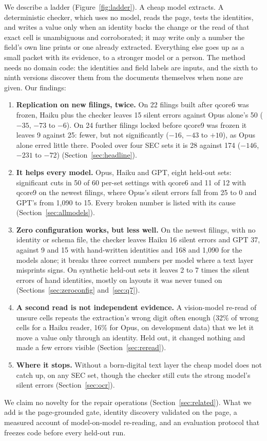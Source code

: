 \documentclass[10pt,twocolumn]{article}
\newcommand{\vq}[1]{\textsf{qcore#1}}
\begin{document}
We describe a ladder (Figure~\ref{fig:ladder}). A cheap model extracts. A deterministic checker, which uses no model, reads the page, tests the identities, and writes a value only when an identity backs the change or the read of that exact cell is unambiguous and corroborated; it may write only a number the field's own line prints or one already extracted. Everything else goes up as a small packet with its evidence, to a stronger model or a person. The method needs no domain code: the identities and field labels are inputs, and the sixth to ninth versions discover them from the documents themselves when none are given. Our findings:
\begin{enumerate}
\item \textbf{Replication on new filings, twice.} On 22 filings built after \vq{6} was frozen, Haiku plus the checker leaves 15 silent errors against Opus alone's 50 ($-35$, $-73$ to $-6$). On 24 further filings locked before \vq{9} was frozen it leaves 9 against 25: fewer, but not significantly ($-16$, $-43$ to $+10$), as Opus alone erred little there. Pooled over four SEC sets it is 28 against 174 ($-146$, $-231$ to $-72$) (Section~\ref{sec:headline}).
\item \textbf{It helps every model.} Opus, Haiku and GPT, eight held-out sets: significant cuts in 50 of 60 per-set settings with \vq{6} and 11 of 12 with \vq{9} on the newest filings, where Opus's silent errors fall from 25 to 0 and GPT's from 1,090 to 15. Every broken number is listed with its cause (Section~\ref{sec:allmodels}).
\item \textbf{Zero configuration works, but less well.} On the newest filings, with no identity or schema file, the checker leaves Haiku 16 silent errors and GPT 37, against 9 and 15 with hand-written identities and 168 and 1,090 for the models alone; it breaks three correct numbers per model where a text layer misprints signs. On synthetic held-out sets it leaves 2 to 7 times the silent errors of hand identities, mostly on layouts it was never tuned on (Sections~\ref{sec:zeroconfig} and~\ref{sec:q7}).
\item \textbf{A second read is not independent evidence.} A vision-model re-read of unsure cells repeats the extraction's wrong digit often enough (32\% of wrong cells for a Haiku reader, 16\% for Opus, on development data) that we let it move a value only through an identity. Held out, it changed nothing and made a few errors visible (Section~\ref{sec:reread}).
\item \textbf{Where it stops.} Without a born-digital text layer the cheap model does not catch up, on any SEC set, though the checker still cuts the strong model's silent errors (Section~\ref{sec:ocr}).
\end{enumerate}
We claim no novelty for the repair operations (Section~\ref{sec:related}). What we add is the page-grounded gate, identity discovery validated on the page, a measured account of model-on-model re-reading, and an evaluation protocol that freezes code before every held-out run.
\end{document}
